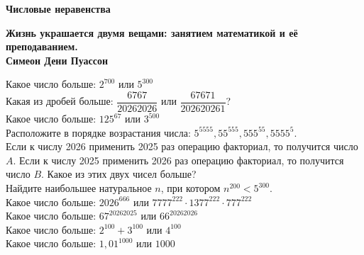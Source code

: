 \centerline{\bf \Huge Числовые неравенства}

\begin{flushright}
        \scriptsize{\textbf{Жизнь украшается двумя вещами: занятием математикой и её преподаванием.\\
         Симеон Дени Пуассон}}
        
\end{flushright}

 Какое число больше:  $2^{700}$ или $5^{300}$\\

 Какая из дробей больше: $\dfrac{6767}{20262026}$ или $\dfrac{67671}{202620261}$?\\

 Какое число больше:  $125^{67}$ или $3^{500}$\\

 Расположите в порядке возрастания числа: $5^{5555}, 55^{555}, 555^{55}, 5555^{5}$.\\

 Если к числу 2026 применить 2025 раз операцию факториал, то получится число $A$. Если к числу 2025 применить 2026 раз операцию факториал, то получится число $B$. Какое из этих двух чисел больше?\\

 Найдите наибольшее натуральное $n$, при котором  $n^{200} < 5^{300}$.\\

 Какое число больше:  $2026^{666}$ или $7777^{222}\cdot1377^{222}\cdot777^{222}$\\

 Какое число больше:  $67^{20262025}$ или $66^{20262026}$\\

 Какое число больше:  $2^{100}+3^{100}$ или $4^{100}$\\

 Какое число больше:  $1,01^{1000}$ или $1000$\\